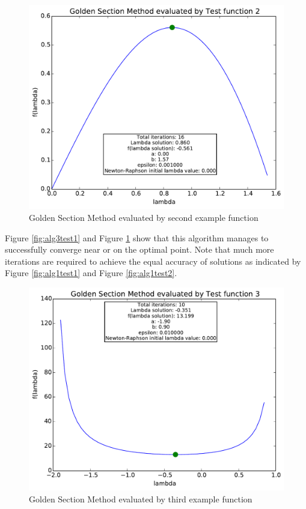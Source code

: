 \documentclass[a4paper,10pt]{article}
\begin{document}
\begin{figure}[h]
\centering
 \includegraphics[scale=0.55]{./graphs/algorithm3/testFunction2.pdf} 
 \caption{Golden Section Method evaluated by second example function}
 \label{fig:alg3test2}
\end{figure}

Figure \ref{fig:alg3test1} and Figure \ref{fig:alg3test2} show that this algorithm manages to successfully converge near or on the optimal point. Note that much more iterations are required to achieve the equal accuracy of solutions as indicated by Figure \ref{fig:alg1test1} and Figure \ref{fig:alg1test2}.

\newpage
\begin{figure}[h]
\centering
 \includegraphics[scale=0.55]{./graphs/algorithm3/testFunction3.pdf} 
 \caption{Golden Section Method evaluated by third example function}
 \label{fig:alg3test3}
\end{figure}
\end{document}
